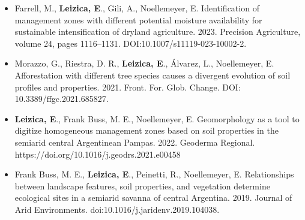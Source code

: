 \documentclass[9.5pt,a4paper,ragged2e, normalphoto]{altacv}
\begin{document}
\begin{itemize}
\item Farrell, M., \textbf{Leizica, E}., Gili, A., Noellemeyer, E. Identification of management zones with different potential moisture availability for sustainable intensification of dryland agriculture. 2023. Precision Agriculture, volume 24, pages 1116–1131. DOI:10.1007/s11119-023-10002-2.

\item Morazzo, G., Riestra, D. R., \textbf{Leizica, E}., Álvarez, L., Noellemeyer, E. Afforestation with different tree species causes a divergent evolution of soil profiles and properties. 2021. Front. For. Glob. Change. DOI: 10.3389/ffgc.2021.685827.

\item \textbf{Leizica, E}., Frank Buss, M. E., Noellemeyer, E. Geomorphology as a tool to digitize homogeneous management zones based on soil properties in the semiarid central Argentinean Pampas. 2022. Geoderma Regional. 
https://doi.org/10.1016/j.geodrs.2021.e00458

\item Frank Buss, M. E., \textbf {Leizica, E}., Peinetti, R., Noellemeyer, E. Relationships between landscape features, soil properties, and vegetation determine ecological sites in a semiarid savanna of central Argentina. 2019. Journal of Arid Environments.
doi:10.1016/j.jaridenv.2019.104038.

\end{itemize}
\newpage
{}
\end{document}
